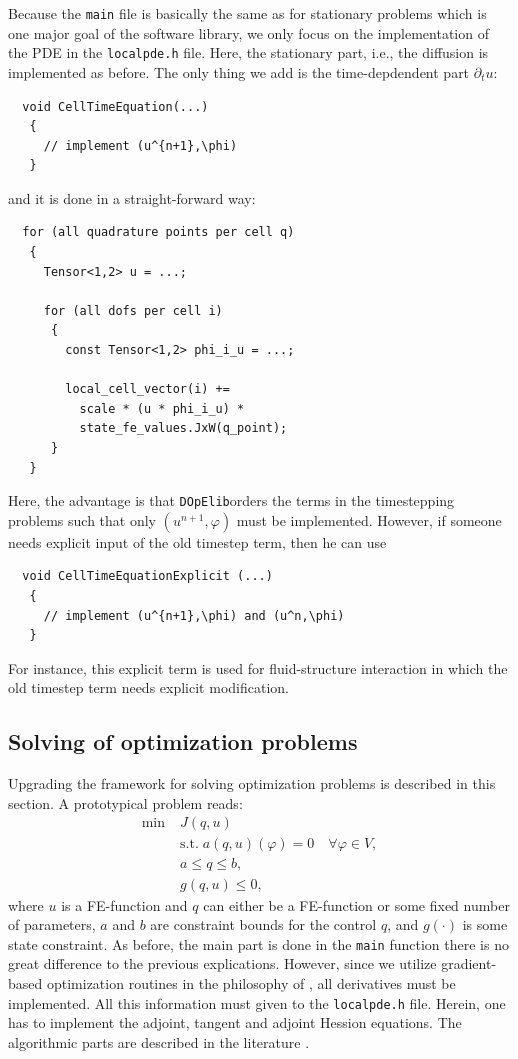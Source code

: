 \documentclass[prodmode,acmtoms]{acmsmall}
\numberwithin{equation}{section}
\renewcommand{\phi}{\varphi}
\newcommand{\dope}{\texttt{DOpElib}}
\begin{document}
Because the \texttt{main} file 
is basically the same as for stationary problems
which is one major goal of the software library,
we only focus on the implementation of the PDE in the 
\texttt{localpde.h} file. Here, the stationary part, i.e.,
the diffusion is implemented as before. The only thing we add 
is the time-depdendent part $\partial_t u$:

\begin{lstlisting}
  void CellTimeEquation(...)
   {
     // implement (u^{n+1},\phi) 
   }
\end{lstlisting}
and it is done in a straight-forward way:
\begin{lstlisting}
  for (all quadrature points per cell q)
   {
     Tensor<1,2> u = ...;

     for (all dofs per cell i)
      {
        const Tensor<1,2> phi_i_u = ...;

        local_cell_vector(i) +=  
          scale * (u * phi_i_u) * 
          state_fe_values.JxW(q_point);
      }
   }
\end{lstlisting}
Here, the advantage is that \dope orders the terms in the timestepping
problems
such that only $(u^{n+1},\phi)$ must be implemented. However, if someone 
needs explicit input of the old timestep term, then he can use 
\begin{lstlisting}
  void CellTimeEquationExplicit (...)
   {
     // implement (u^{n+1},\phi) and (u^n,\phi)  
   }
\end{lstlisting}
For instance, this explicit term is used for fluid-structure interaction in
which
the old timestep term needs explicit modification.   





\subsection{Solving of optimization problems}
Upgrading the framework for solving optimization problems
is described in this section. A prototypical problem reads:
\begin{align*}
\min\;&J(q,u) \\
  &\text{s.t.}\; a(q,u)(\phi) = 0 \quad \forall \phi\in V,\\
  &a \le q \le b,\\
  &g(q,u) \le 0,  
\end{align*}
where $u$ is a FE-function and $q$ can either be a FE-function or some 
fixed number of parameters, $a$ and $b$ are constraint bounds for the control $q$,
and $g(\cdot)$ is some state constraint.
As before, the main part is done in the \texttt{main} function there is no
great difference to the previous explications. However, 
since we utilize gradient-based optimization routines in the philosophy of
\cite{Troe99,HiKu01},
all derivatives must be implemented. All this information
must given to the \texttt{localpde.h} file. Herein, one has to 
implement the adjoint, tangent and adjoint Hession equations. 
The algorithmic parts are described in the literature \cite{BeMeVe06}.
\end{document}
